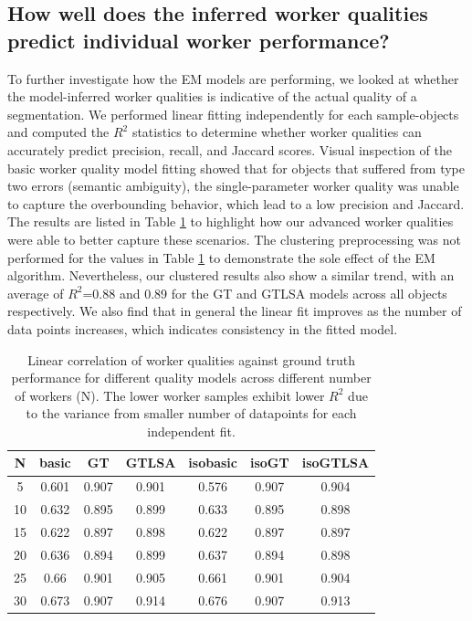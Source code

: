\subsection{How well does the inferred worker qualities predict individual worker performance?}
     To further investigate how the EM models are performing, we looked at whether the model-inferred worker qualities is indicative of the actual quality of a segmentation. We performed linear fitting independently for each sample-objects and computed the $R^2$ statistics to determine whether worker qualities can accurately predict precision, recall, and Jaccard scores. Visual inspection of the basic worker quality model fitting showed that for objects that suffered from type two errors (semantic ambiguity), the single-parameter worker quality was unable to capture the overbounding behavior, which lead to a low precision and Jaccard. The results are listed in Table \ref{correlation} to highlight how our advanced worker qualities were able to better capture these scenarios. The clustering preprocessing was not performed for the values in Table \ref{correlation} to demonstrate the sole effect of the EM algorithm. Nevertheless, our clustered results also show a similar trend, with an average of $R^2$=0.88 and 0.89 for the GT and GTLSA models across all objects respectively. We also find that in general the linear fit improves as the number of data points increases, which indicates consistency in the fitted model.
    \begin{table}[ht!]
      \small
      \begin{tabular}{ccccccc}
        \hline
           N &   basic &   GT &   GTLSA &   isobasic &   isoGT &   isoGTLSA \\
        \hline
              5 &      0.601 &   0.907 &      0.901 &       0.576 &    0.907 &       0.904 \\
            10 &      0.632 &   0.895 &      0.899 &       0.633 &    0.895 &       0.898 \\
            15 &      0.622 &   0.897 &      0.898 &       0.622 &    0.897 &       0.897 \\
            20 &      0.636 &   0.894 &      0.899 &       0.637 &    0.894 &       0.898 \\
            25 &      0.66  &   0.901 &      0.905 &       0.661 &    0.901 &       0.904 \\
            30 &      0.673 &   0.907 &      \cellcolor{blue!25}0.914 &       0.676 &    0.907 &       \cellcolor{blue!25}0.913 \\
        \hline
      \end{tabular}
        \caption{Linear correlation of worker qualities against ground truth performance for different quality models across different number of workers (N). The lower worker samples exhibit lower $R^2$ due to the variance from smaller number of datapoints for each independent fit. }
        \label{correlation}
    \end{table}
